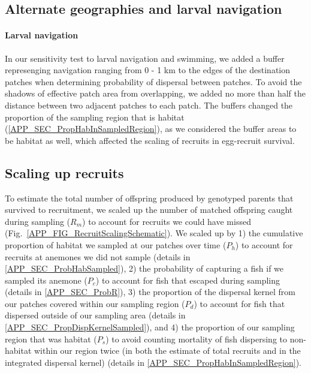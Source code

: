 \documentclass[12pt, oneside]{article}   	%
\begin{document}

\subsection{Alternate geographies and larval navigation}

\paragraph{Larval navigation} \label{APP_SEC_METHODS_Larval_nav}

In our sensitivity test to larval navigation and swimming, we added a buffer represenging navigation ranging from 0 - 1 km to the edges of the destination patches when determining probability of dispersal between patches. To avoid the shadows of effective patch area from overlapping, we added no more than half the distance between two adjacent patches to each patch. The buffers changed the proportion of the sampling region that is habitat (\ref{APP_SEC_PropHabInSampledRegion}), as we considered the buffer areas to be habitat as well, which affected the scaling of recruits in egg-recruit survival.

\subsection{Scaling up recruits} \label{APP_SEC_METHODS_ScalingUpRecruits}

To estimate the total number of offspring produced by genotyped parents that survived to recruitment, we scaled up the number of matched offspring caught during sampling ($R_m$) to account for recruits we could have missed (Fig.\ \ref{APP_FIG_RecruitScalingSchematic}). We scaled up by 1) the cumulative proportion of habitat we sampled at our patches over time ($P_h$) to account for recruits at anemones we did not sample (details in \ref{APP_SEC_ProbHabSampled}), 2) the probability of capturing a fish if we sampled its anemone ($P_c$) to account for fish that escaped during sampling (details in \ref{APP_SEC_ProbR}), 3) the proportion of the dispersal kernel from our patches covered within our sampling region ($P_d$) to account for fish that dispersed outside of our sampling area (details in \ref{APP_SEC_PropDispKernelSampled}), and 4) the proportion of our sampling region that was habitat ($P_s$) to avoid counting mortality of fish dispersing to non-habitat within our region twice (in both the estimate of total recruits and in the integrated dispersal kernel) (details in \ref{APP_SEC_PropHabInSampledRegion}). %
\end{document}
